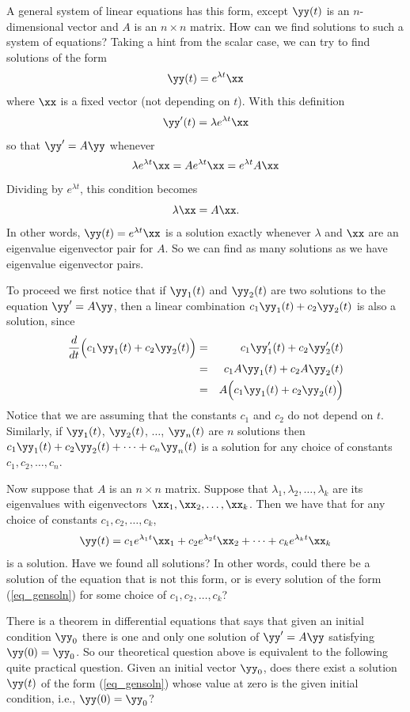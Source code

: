 A general system of linear equations has this form, except $\yy(t)$ is
an $n$-dimensional vector and $A$ is an $n\times n$ matrix.  How can
we find solutions to such a system of equations? Taking a hint from
the scalar case, we can try to find solutions of the form
\[
\yy(t) = e^{\lambda t}\xx
\]
where $\xx$ is a fixed vector (not depending on $t$). With this definition
\[
\yy'(t) = \lambda e^{\lambda t}\xx
\]
so that $\yy'=A\yy$ whenever
\[
\lambda e^{\lambda t}\xx = A e^{\lambda t}\xx =  e^{\lambda t}A\xx
\]
Dividing by $e^{\lambda t}$, this condition becomes
\[
\lambda\xx = A\xx.
\]
In other words, $\yy(t) = e^{\lambda t}\xx$ is a solution exactly
whenever $\lambda$ and $\xx$ are an eigenvalue eigenvector pair for
$A$.  So we can find as many solutions as we have eigenvalue
eigenvector pairs.

To proceed we first notice that if $\yy_1(t)$ and $\yy_2(t)$ are two
solutions to the equation $\yy'=A\yy$, then a linear combination
$c_1\yy_1(t)+c_2\yy_2(t)$ is also a solution, since
\begin{eqnarray*}
{{d}\over{dt}}\Big(c_1\yy_1(t)+c_2\yy_2(t)\Big)
&=&c_1\yy_1'(t)+c_2\yy_2'(t) \\
&=&c_1A\yy_1(t)+c_2A\yy_2(t) \\
&=&A\Big(c_1\yy_1(t)+c_2\yy_2(t)\Big) 
\end{eqnarray*}
Notice that we are assuming that the constants $c_1$ and $c_2$ do not
depend on $t$.  Similarly, if $\yy_1(t)$, $\yy_2(t)$, $\ldots$,
$\yy_n(t)$ are $n$ solutions then $c_1\yy_1(t)+c_2\yy_2(t)+\cdots
+c_n\yy_n(t)$ is a solution for any choice of constants
$c_1,c_2,\ldots, c_n$.

Now suppose that $A$ is an $n\times n$ matrix. Suppose that
$\lambda_1,\lambda_2,\ldots,\lambda_k$ are its eigenvalues with
eigenvectors $\xx_1, \xx_2, \ldots, \xx_k$. Then we have that for any
choice of constants $c_1, c_2, \ldots, c_k$,
\begin{equation}
\label{eq_gensoln}
\yy(t) = c_1e^{\lambda_1 t}\xx_1 +  c_2e^{\lambda_2 t}\xx_2
+\cdots + c_ke^{\lambda_k t}\xx_k
\end{equation}
is a solution.  Have we found all solutions? In other words, could
there be a solution of the equation that is not this form, or is every
solution of the form (\ref{eq_gensoln}) for some choice of $c_1, c_2,
\ldots, c_k$?

There is a theorem in differential equations that says that given an
initial condition $\yy_0$ there is one and only one solution of
$\yy' = A\yy$ satisfying $\yy(0)=\yy_0$.  So our theoretical question
above is equivalent to the following quite practical question. Given
an initial vector $\yy_0$, does there exist a solution $\yy(t)$ of the
form (\ref{eq_gensoln}) whose value at zero is the given initial condition,
i.e., $\yy(0)=\yy_0$?

